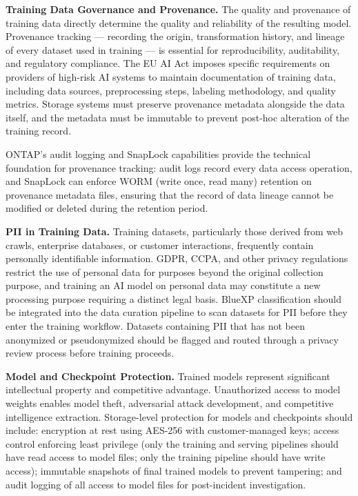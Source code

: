 \begin{securitybox}

\textbf{Training Data Governance and Provenance.}
The quality and provenance of training data directly determine the quality and
reliability of the resulting model. Provenance tracking --- recording the
origin, transformation history, and lineage of every dataset used in training
--- is essential for reproducibility, auditability, and regulatory compliance.
The EU AI Act imposes specific requirements on providers of high-risk AI
systems to maintain documentation of training data, including data sources,
preprocessing steps, labeling methodology, and quality metrics. Storage
systems must preserve provenance metadata alongside the data itself, and the
metadata must be immutable to prevent post-hoc alteration of the training
record.

ONTAP's audit logging and SnapLock capabilities provide the technical
foundation for provenance tracking: audit logs record every data access
operation, and SnapLock can enforce WORM (write once, read many) retention on
provenance metadata files, ensuring that the record of data lineage cannot be
modified or deleted during the retention period.

\textbf{PII in Training Data.}
Training datasets, particularly those derived from web crawls, enterprise
databases, or customer interactions, frequently contain personally
identifiable information. GDPR, CCPA, and other privacy regulations restrict
the use of personal data for purposes beyond the original collection purpose,
and training an AI model on personal data may constitute a new processing
purpose requiring a distinct legal basis. BlueXP classification should be
integrated into the data curation pipeline to scan datasets for PII before
they enter the training workflow. Datasets containing PII that has not been
anonymized or pseudonymized should be flagged and routed through a privacy
review process before training proceeds.

\textbf{Model and Checkpoint Protection.}
Trained models represent significant intellectual property and competitive
advantage. Unauthorized access to model weights enables model theft,
adversarial attack development, and competitive intelligence extraction.
Storage-level protection for models and checkpoints should include: encryption
at rest using AES-256 with customer-managed keys; access control enforcing
least privilege (only the training and serving pipelines should have read
access to model files; only the training pipeline should have write access);
immutable snapshots of final trained models to prevent tampering; and audit
logging of all access to model files for post-incident investigation.


\end{securitybox}
